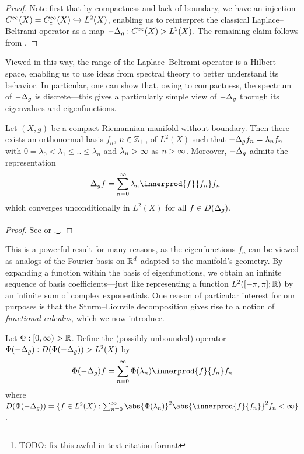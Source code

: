 \documentclass[11pt]{book}
\begin{document}
\begin{proof}
Note first that by compactness and lack of boundary, we have an injection $C^\infty(X) = C^\infty_c(X) \hookrightarrow L^2(X)$, enabling us to reinterpret the classical Laplace--Beltrami operator as a map $-\Delta_g : C^\infty(X) \-> L^2(X)$.
The remaining claim follows from \textcite[Theorem 2.4]{strichartz83}.
\end{proof}

Viewed in this way, the range of the Laplace--Beltrami operator is a Hilbert space, enabling us to use ideas from spectral theory to better understand its behavior.
In particular, one can show that, owing to compactness, the spectrum of $-\Delta_g$ is discrete---this gives a particularly simple view of $-\Delta_g$ thorugh its eigenvalues and eigenfunctions.

\begin{result}
Let $(X,g)$ be a compact Riemannian manifold without boundary.
Then there exists an orthonormal basis $f_n$, $n\in\mathbb{Z}_+$, of $L^2(X)$ such that $-\Delta_g f_n = \lambda_n f_n$ with $0 = \lambda_0 < \lambda_1 \leq .. \leq \lambda_n$ and $\lambda_n\-> \infty$ as $n\->\infty$.
Moreover, $-\Delta_g$ admits the representation
\[
-\lap_g f = \sum_{n=0}^\infty \lambda_n \innerprod{f}{f_n} f_n
\]
which converges unconditionally in $L^2(X)$ for all $f \in D(\Delta_g)$.
\end{result}

\begin{proof}
See \textcite[page 139]{chavel84} or \textcite[Theorem 44]{canzani13}.\footnote{TODO: fix this awful in-text citation format}.
\end{proof}

This is a powerful result for many reasons, as the eigenfunctions $f_n$ can be viewed as analogs of the Fourier basis  on $\mathbb{R}^d$ adapted to the manifold's geometry.
By expanding a function within the basis of eigenfunctions, we obtain an infinite sequence of basis coefficients---just like representing a function $L^2([-\pi,\pi];\mathbb{R})$ by an infinite sum of complex exponentials.
One reason of particular interest for our purposes is that the Sturm--Liouvile decomposition gives rise to a notion of \emph{functional calculus}, which we now introduce.

\begin{definition}
Let $\Phi : [0,\infty) \-> \mathbb{R}$. 
Define the (possibly unbounded) operator $\Phi(-\Delta_g) : D(\Phi(-\Delta_g)) \-> L^2(X)$ by
\[
\Phi(-\lap_g) f = \sum_{n=0}^\infty \Phi(\lambda_n) \innerprod{f}{f_n} f_n
\]
where $D(\Phi(-\lap_g)) = \{f \in L^2(X) : \sum_{n=0}^\infty \abs{\Phi(\lambda_n)}^2 \abs{\innerprod{f}{f_n}}^2 f_n < \infty\}$.
\end{definition}
\end{document}
